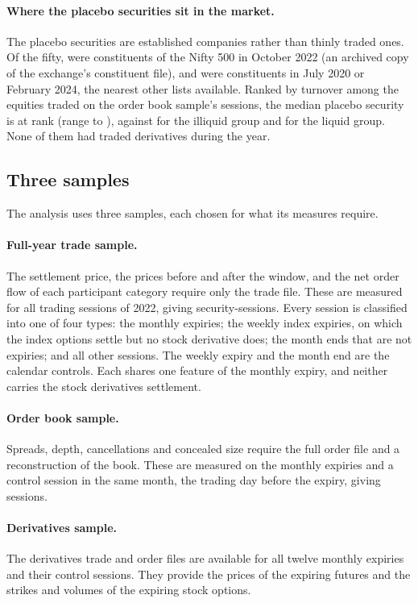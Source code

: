 

\paragraph{Where the placebo securities sit in the market.} The placebo securities are
established companies rather than thinly traded ones. Of the fifty, \PlacebocheckPlaceboNFiveZeroZero{}
were constituents of the Nifty 500 in October 2022 (an archived copy of the exchange's
constituent file), and \PlacebocheckPlaceboNFiveZeroZeroeither{} were constituents in July 2020 or
February 2024, the nearest other lists available. Ranked by turnover among the
\PlacebocheckMarket{} equities traded on the order book sample's sessions, the median placebo
security is at rank \PlacebocheckPlaceboRankmedian{} (range \PlacebocheckPlaceboRankmin{} to
\PlacebocheckPlaceboRankmax{}), against \PlacebocheckIlliquidRankmedian{} for the illiquid group
and \PlacebocheckLiquidRankmedian{} for the liquid group. None of them had traded derivatives
during the year.

\subsection{Three samples}

The analysis uses three samples, each chosen for what its measures require.

\paragraph{Full-year trade sample.} The settlement price, the prices before and after the
window, and the net order flow of each participant category require only the trade file.
These are measured for all \TapeSessions{} trading sessions of 2022, giving
\TapeObservations{} security-sessions. Every session is classified into one of four types:
the \TapeNMonthlyexpiry{} monthly expiries; the \TapeNWeeklyexpiry{} weekly index expiries,
on which the index options settle but no stock derivative does; the \TapeNMonthend{} month
ends that are not expiries; and all other sessions. The weekly expiry and the month end are
the calendar controls. Each shares one feature of the monthly expiry, and neither carries the
stock derivatives settlement.

\paragraph{Order book sample.} Spreads, depth, cancellations and concealed size require the
full order file and a reconstruction of the book. These are measured on the
\DesignExpirySessions{} monthly expiries and a control session in the same month, the
trading day before the expiry, giving \DesignSessions{} sessions.

\paragraph{Derivatives sample.} The derivatives trade and order files are available for all
twelve monthly expiries and their control sessions. They provide the prices of
the expiring futures and the strikes and volumes of the expiring stock options.
